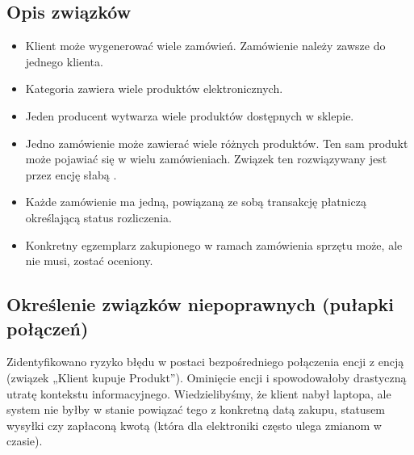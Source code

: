 \documentclass[letterpaper,10pt,polish]{sphinxmanual}
\begin{document}
\subsection{Opis związków}
\label{\detokenize{rozdzia_u0142_3/BD_PlanBazyDanych_zad1/index:opis-zwiazkow}}\begin{itemize}
\item {} 
\sphinxAtStartPar
{} Klient może wygenerować wiele zamówień. Zamówienie należy zawsze do jednego klienta.

\item {} 
\sphinxAtStartPar
{} Kategoria zawiera wiele produktów elektronicznych.

\item {} 
\sphinxAtStartPar
{} Jeden producent wytwarza wiele produktów dostępnych w sklepie.

\item {} 
\sphinxAtStartPar
{} Jedno zamówienie może zawierać wiele różnych produktów. Ten sam produkt może pojawiać się w wielu zamówieniach. Związek ten rozwiązywany jest przez encję słabą .

\item {} 
\sphinxAtStartPar
{} Każde zamówienie ma jedną, powiązaną ze sobą transakcję płatniczą określającą status rozliczenia.

\item {} 
\sphinxAtStartPar
{} Konkretny egzemplarz zakupionego w ramach zamówienia sprzętu może, ale nie musi, zostać oceniony.

\end{itemize}


\subsection{Określenie związków niepoprawnych (pułapki połączeń)}
\label{\detokenize{rozdzia_u0142_3/BD_PlanBazyDanych_zad1/index:okreslenie-zwiazkow-niepoprawnych-pulapki-polaczen}}
\sphinxAtStartPar
{} Zidentyfikowano ryzyko błędu w postaci bezpośredniego połączenia encji  z encją  (związek „Klient kupuje Produkt”). Ominięcie encji  i  spowodowałoby drastyczną utratę kontekstu informacyjnego. Wiedzielibyśmy, że klient nabył laptopa, ale system nie byłby w stanie powiązać tego z konkretną datą zakupu, statusem wysyłki czy zapłaconą kwotą (która dla elektroniki często ulega zmianom w czasie).
\end{document}
